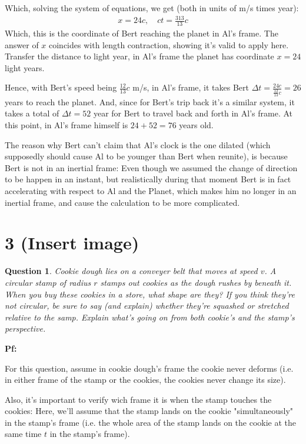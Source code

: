 \documentclass{article}
\newtheorem{question}{Question}
\begin{document}
Which, solving the system of equations, we get (both in units of m/s times year):
\begin{align}
    x= 24c,\quad ct = \frac{313}{13}c
\end{align}
Which, this is the coordinate of Bert reaching the planet in Al's frame. The answer of $x$ coincides with length contraction, showing it's valid to apply here. Transfer the distance to light year, in Al's frame the planet has coordinate $x=24$ light years.

Hence, with Bert's speed being $\frac{12}{13}c$ m/s, in Al's frame, it takes Bert $\Delta t = \frac{24c}{\frac{12}{13}c} = 26$ years to reach the planet. And, since for Bert's trip back it's a similar system, it takes a total of $\Delta t=52$ year for Bert to travel back and forth in Al's frame. At this point, in Al's frame himself is $24 + 52 = 76$ years old.

\hfil

The reason why Bert can't claim that Al's clock is the one dilated (which supposedly should cause Al to be younger than Bert when reunite), is because Bert is not in an inertial frame: Even though we assumed the change of direction to be happen in an instant, but realistically during that moment Bert is in fact accelerating with respect to Al and the Planet, which makes him no longer in an inertial frame, and cause the calculation to be more complicated.

\break

\section*{3 (Insert image)}
\begin{question}\label{q3}
    Cookie dough lies on a conveyer belt that moves at speed $v$. A circular stamp of radius $r$ stamps out cookies as the dough rushes by beneath it. When you buy these cookies in a store, what shape are they? If you think they're not circular, be sure to say (and explain) whether they're squashed or stretched relative to the samp. Explain what's going on from both cookie's and the stamp's perspective.
\end{question}

\textbf{Pf:}

For this question, assume in cookie dough's frame the cookie never deforms (i.e. in either frame of the stamp or the cookies, the cookies never change its size). 

Also, it's important to verify wich frame it is when the stamp touches the cookies: Here, we'll assume that the stamp lands on the cookie "simultaneously" in the stamp's frame (i.e. the whole area of the stamp lands on the cookie at the same time $t$ in the stamp's frame).
\end{document}
